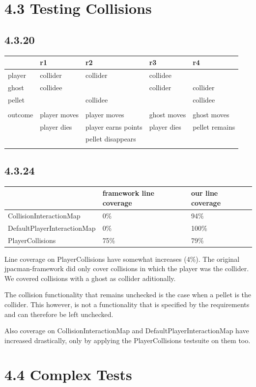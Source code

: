 \documentclass[]{article}
\begin{document}
\section{4.3 Testing Collisions}\label{testing-collisions}

\subsection{4.3.20}\label{section-12}

\begin{longtable}[]{@{}lllll@{}}
\toprule
& r1 & r2 & r3 & r4\tabularnewline
\midrule
\endhead
player & collider & collider & collidee &\tabularnewline
ghost & collidee & & collider & collider\tabularnewline
pellet & & collidee & & collidee\tabularnewline
& & & &\tabularnewline
outcome & player moves & player moves & ghost moves & ghost
moves\tabularnewline
& player dies & player earns points & player dies & pellet
remains\tabularnewline
& & pellet disappears & &\tabularnewline
& & & &\tabularnewline
\bottomrule
\end{longtable}

\subsection{4.3.24}\label{section-13}

\begin{longtable}[]{@{}lll@{}}
\toprule
& framework line coverage & our line coverage\tabularnewline
\midrule
\endhead
CollisionInteractionMap & 0\% & 94\%\tabularnewline
DefaultPlayerInteractionMap & 0\% & 100\%\tabularnewline
PlayerCollisions & 75\% & 79\%\tabularnewline
\bottomrule
\end{longtable}

Line coverage on PlayerCollisions have somewhat increases (4\%). The
original jpacman-framework did only cover collisions in which the player
was the collider. We covered collisions with a ghost as collider
aditionally.

The collision functionality that remains unchecked is the case when a
pellet is the collider. This however, is not a functionality that is
specified by the requirements and can therefore be left unchecked.

Also coverage on CollisionInteractionMap and DefaultPlayerInteractionMap
have increased drastically, only by applying the PlayerCollisions
testsuite on them too.

\section{4.4 Complex Tests}\label{complex-tests}
\end{document}
